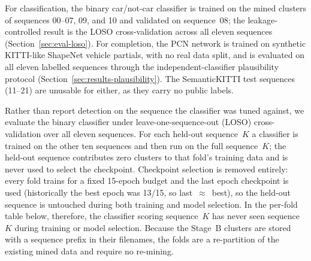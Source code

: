 For classification, the binary car/not-car classifier is trained on the mined clusters of sequences 00--07, 09, and
10 and validated on sequence~08; the leakage-controlled result is the LOSO cross-validation
across all eleven sequences (Section~\ref{sec:eval-loso}). For completion, the PCN
network is trained on synthetic KITTI-like ShapeNet vehicle partials, with no real data split,
and is evaluated on all eleven labelled sequences through the independent-classifier
plausibility protocol (Section~\ref{sec:results-plausibility}). The SemanticKITTI test
sequences (11--21) are unusable for either, as they carry no public labels.

Rather than report detection on the sequence the classifier was tuned against, we
evaluate the binary classifier under leave-one-sequence-out (LOSO)
cross-validation over all eleven sequences. For each held-out sequence~$K$ a
classifier is trained on the other ten sequences and then run on the full
sequence~$K$; the held-out sequence contributes zero clusters to that
fold's training data and is never used to select the checkpoint. Checkpoint
selection is removed entirely: every fold trains for a fixed \num{15}-epoch
budget and the last epoch checkpoint is used (historically the best epoch was
\num{13}/\num{15}, so last~$\approx$~best), so the held-out sequence is untouched
during both training and model selection. In the per-fold table below,
therefore, the classifier scoring sequence~$K$ has never seen
sequence~$K$ during training or model selection. Because the
Stage~B clusters are stored with a sequence prefix in their filenames, the folds
are a re-partition of the existing mined data and require no re-mining.

